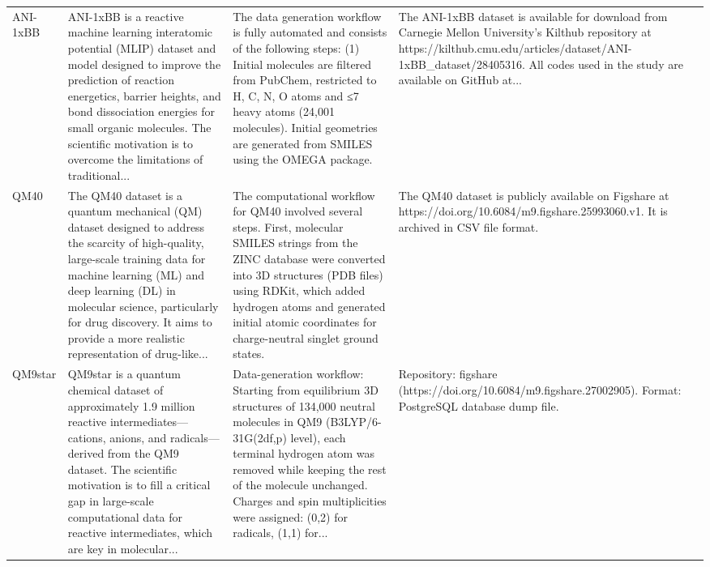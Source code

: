 \documentclass[12pt]{article}
\begin{document}
\begin{longtable}{p{}p{}p{}p{}}
ANI-1xBB \cite{ds47-1} & ANI-1xBB is a reactive machine learning interatomic potential (MLIP) dataset and model designed to improve the prediction of reaction energetics, barrier heights, and bond dissociation energies for small organic molecules. The scientific motivation is to overcome the limitations of traditional... & The data generation workflow is fully automated and consists of the following steps: (1) Initial molecules are filtered from PubChem, restricted to H, C, N, O atoms and ≤7 heavy atoms (24,001 molecules). Initial geometries are generated from SMILES using the OMEGA package. & The ANI-1xBB dataset is available for download from Carnegie Mellon University's Kilthub repository at https://kilthub.cmu.edu/articles/dataset/ANI-1xBB\_dataset/28405316. All codes used in the study are available on GitHub at... \cite{ds47-1,ds47-2} \\
QM40 \cite{ds48-1} & The QM40 dataset is a quantum mechanical (QM) dataset designed to address the scarcity of high-quality, large-scale training data for machine learning (ML) and deep learning (DL) in molecular science, particularly for drug discovery. It aims to provide a more realistic representation of drug-like... & The computational workflow for QM40 involved several steps. First, molecular SMILES strings from the ZINC database were converted into 3D structures (PDB files) using RDKit, which added hydrogen atoms and generated initial atomic coordinates for charge-neutral singlet ground states. & The QM40 dataset is publicly available on Figshare at https://doi.org/10.6084/m9.figshare.25993060.v1. It is archived in CSV file format. \cite{ds48-1,ds48-2} \\
QM9star \cite{ds49-1} & QM9star is a quantum chemical dataset of approximately 1.9 million reactive intermediates—cations, anions, and radicals—derived from the QM9 dataset. The scientific motivation is to fill a critical gap in large-scale computational data for reactive intermediates, which are key in molecular... & Data-generation workflow: Starting from equilibrium 3D structures of 134,000 neutral molecules in QM9 (B3LYP/6-31G(2df,p) level), each terminal hydrogen atom was removed while keeping the rest of the molecule unchanged. Charges and spin multiplicities were assigned: (0,2) for radicals, (1,1) for... & Repository: figshare (https://doi.org/10.6084/m9.figshare.27002905). Format: PostgreSQL database dump file. \cite{ds49-1,ds49-2} \\

\end{longtable}
\end{document}
